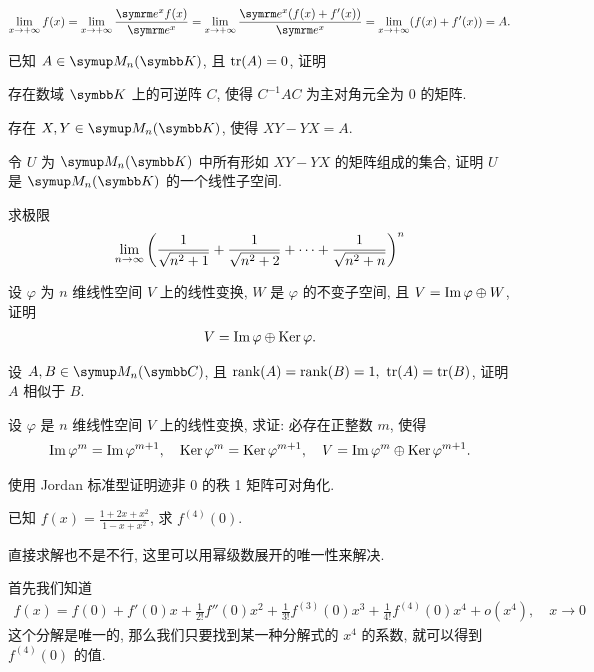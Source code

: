 \begin{exercise}[series=exer]
\begin{answer}
        \begin{align*}
            \limit{x}{+\infty} f(x) = \limit{x}{+\infty} \frac{\me^{x} f(x)}{\me^{x}} = \limit{x}{+\infty} \frac{\me^{x}(f(x) + f'(x))}{\me^{x}} = \limit{x}{+\infty} (f(x) + f'(x)) = A.
        \end{align*}
    \end{answer}
    \item 已知 $ A \in \MM[\K] $, 且 $ \tr(A) = 0 $, 证明
    \begin{exercise}
        \item 存在数域 $ \K $ 上的可逆阵 $ C $, 使得 $ C^{-1}AC $ 为主对角元全为 $ 0 $ 的矩阵.
        \item 存在 $ X, Y \in \MM[\K] $, 使得 $ XY - YX = A $.
        \item 令 $ U $ 为 $ \MM[\K] $ 中所有形如 $ XY - YX $ 的矩阵组成的集合, 证明 $ U $ 是 $ \MM[\K] $ 的一个线性子空间. 
    \end{exercise}
    \item 求极限
    \begin{align*}
        \lim_{n \to \infty} \qty(\frac{1}{\sqrt{n^{2} + 1}} + \frac{1}{\sqrt{n^{2} + 2}} + \dots + \frac{1}{\sqrt{n^{2} + n}})^{n}
    \end{align*}
    \item 设 $ \varphi $ 为 $ n $ 维线性空间 $ V $ 上的线性变换, $ W $ 是 $ \varphi $ 的不变子空间, 且 $ V = \operatorname{Im} \varphi \oplus W $, 证明
    \begin{align*}
        V = \operatorname{Im} \varphi \oplus \operatorname{Ker} \varphi.
    \end{align*}
    \item 设 $ A, B \in \MM[\C] $, 且 $ \rank(A) = \rank(B)  = 1,\ \tr(A) = \tr(B) $, 证明 $ A $ 相似于 $ B $.
    \item 设 $ \varphi $ 是 $ n $ 维线性空间 $ V $ 上的线性变换, 求证: 必存在正整数 $ m $, 使得
    \begin{align*}
        \operatorname{Im} \varphi^{m} = \operatorname{Im} \varphi^{m+1},\quad \operatorname{Ker} \varphi^{m} = \operatorname{Ker} \varphi^{m+1}, \quad V = \operatorname{Im} \varphi^{m} \oplus \operatorname{Ker} \varphi^{m+1}.
    \end{align*}
    \item 使用 Jordan 标准型证明迹非 $ 0 $ 的秩 1 矩阵可对角化.
    \item 已知 $ f(x) = \frac{1 + 2x + x^{2}}{1 - x + x^{2}} $, 求 $ f^{(4)}(0) $.
    \begin{hint}
        直接求解也不是不行, 这里可以用幂级数展开的唯一性来解决. 
    \end{hint}
    \begin{answer}
        首先我们知道 
        \begin{align*}
            f(x) = f(0) + f'(0)x + \frac{1}{2!}f''(0)x^{2} + \frac{1}{3!}f^{(3)}(0)x^{3} + \frac{1}{4!}f^{(4)}(0)x^{4} + o(x^{4}),\quad x \to 0
        \end{align*}
        这个分解是唯一的, 那么我们只要找到某一种分解式的 $ x^{4} $ 的系数, 就可以得到 $ f^{(4)}(0) $ 的值. 


\end{answer}
\end{exercise}
